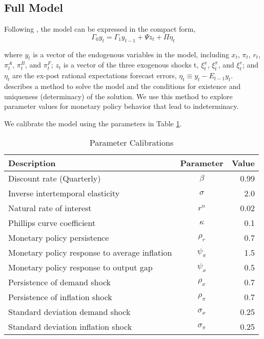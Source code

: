 \documentclass[english,authoryear,12pt]{elsarticle}
\begin{document}
\subsection{Full Model}

Following \citealp{sims2002}, the model can be expressed in the compact form,
\begin{equation}
	\Gamma_0 y_t = \Gamma_1 y_{t-1} + \Psi z_t + \Pi \eta_t
\end{equation}

where $y_t$ is a vector of the endogenous variables in the model, including $x_t$, $\pi_t$, $r_t$, $\pi_t^A$, $\pi_t^B$, and $\pi_t^F$; $z_t$ is a vector of the three exogenous shocks t, $\xi_t^x$, $\xi_t^\pi$, and $\xi_t^r$; and $\eta_t$ are the ex-post rational expectations forecast errors, $\eta_t \equiv y_t - E_{t-1} y_t$. \citealp{sims2002} describes a method to solve the model and the conditions for existence and uniqueness (determinacy) of the solution. We use this method to explore parameter values for monetary policy behavior that lead to indeterminacy.

We calibrate the model using the parameters in Table \ref{tb:parms}.

\begin{table}[htp]
	\caption{Parameter Calibrations}\label{tb:parms}
	\begin{center}
		\begin{tabular}{lcr} \hline
			Description & Parameter & Value \\ \hline
			Discount rate (Quarterly) & $\beta$ & 0.99 \\
			Inverse intertemporal elasticity & $\sigma$ & 2.0 \\
			Natural rate of interest & $r^n$ & 0.02 \\
			Phillips curve coefficient & $\kappa$ & 0.1 \\
			Monetary policy persistence & $\rho_r$ & 0.7 \\
			Monetary policy response to average inflation & $\psi_\pi$ & 1.5 \\
			Monetary policy response to output gap & $\psi_x$ & 0.5 \\
			Persistence of demand shock & $\rho_x$ & 0.7 \\
			Persistence of inflation shock & $\rho_\pi$ & 0.7 \\
			Standard deviation demand shock & $\sigma_x$ & 0.25 \\
			Standard deviation inflation shock & $\sigma_\pi$ & 0.25 \\
			\hline
		\end{tabular}
	\end{center}
\end{table}
\end{document}
